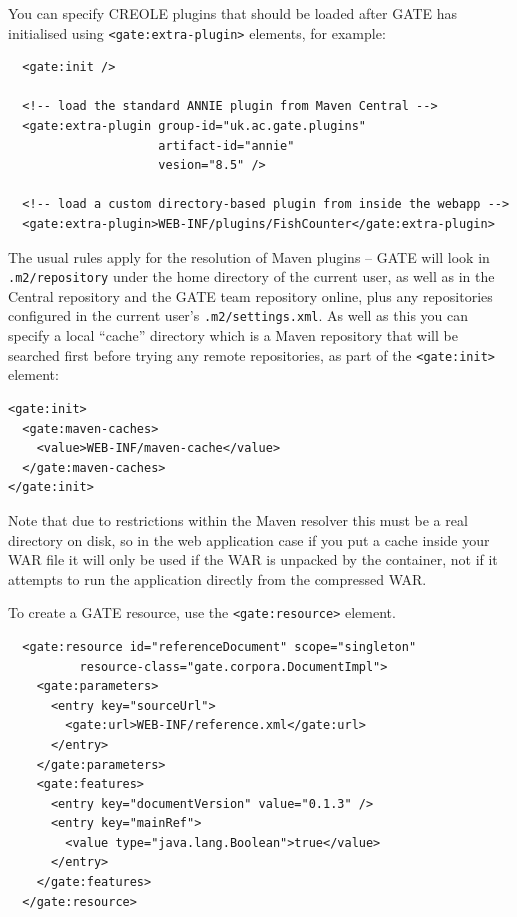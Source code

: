 You can specify CREOLE plugins that should be loaded after GATE has initialised
using \verb|<gate:extra-plugin>| elements, for example:
\begin{small}\begin{verbatim}
  <gate:init />

  <!-- load the standard ANNIE plugin from Maven Central -->
  <gate:extra-plugin group-id="uk.ac.gate.plugins"
                     artifact-id="annie"
                     vesion="8.5" />

  <!-- load a custom directory-based plugin from inside the webapp -->
  <gate:extra-plugin>WEB-INF/plugins/FishCounter</gate:extra-plugin>
\end{verbatim}\end{small}
%
The usual rules apply for the resolution of Maven plugins -- GATE will look in
\verb!.m2/repository! under the home directory of the current user, as well as
in the Central repository and the GATE team repository online, plus any
repositories configured in the current user's \verb!.m2/settings.xml!.  As well
as this you can specify a local ``cache'' directory which is a Maven repository
that will be searched first before trying any remote repositories, as part of
the \verb!<gate:init>! element:
\begin{small}\begin{verbatim}
<gate:init>
  <gate:maven-caches>
    <value>WEB-INF/maven-cache</value>
  </gate:maven-caches>
</gate:init>
\end{verbatim}\end{small}
%
Note that due to restrictions within the Maven resolver this must be a real
directory on disk, so in the web application case if you put a cache inside
your WAR file it will only be used if the WAR is unpacked by the container, not
if it attempts to run the application directly from the compressed WAR.

To create a GATE resource, use the \verb|<gate:resource>| element.
\begin{small}\begin{verbatim}
  <gate:resource id="referenceDocument" scope="singleton"
          resource-class="gate.corpora.DocumentImpl">
    <gate:parameters>
      <entry key="sourceUrl">
        <gate:url>WEB-INF/reference.xml</gate:url>
      </entry>
    </gate:parameters>
    <gate:features>
      <entry key="documentVersion" value="0.1.3" />
      <entry key="mainRef">
        <value type="java.lang.Boolean">true</value>
      </entry>
    </gate:features>
  </gate:resource>
\end{verbatim}\end{small}

